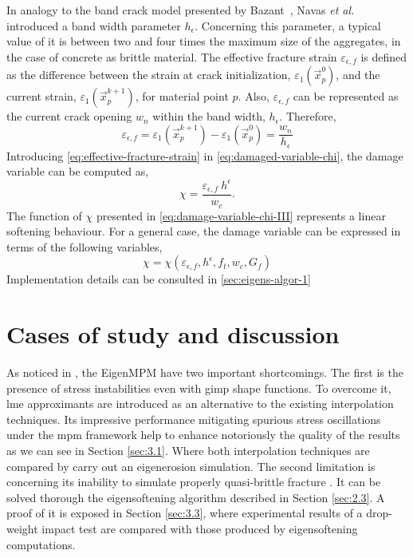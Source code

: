 \documentclass[preprint,12pt,a4paper]{elsarticle}
\begin{document}
In analogy to the band crack model presented by
Bazant~\cite{Bazant83}, Navas {\it et al.} \cite{Navas_2018_ES}
\cite{Navas_2017_ES} introduced a band width parameter $h_{\epsilon}$.
Concerning this parameter, a typical value of it is between two and
four times the maximum size of the aggregates, in the case of
concrete as brittle material. The effective fracture strain
$\varepsilon_{\epsilon,f}$ is defined as the difference between the strain at crack initialization,
$\varepsilon_1(\vec{x}_p^{0})$, and the current strain, $\varepsilon_1(\vec{x}_p^{k+1})$, for material point $p$. Also,
$\varepsilon_{\epsilon,f}$ can be represented as the current crack
opening $w_n$ within the band width, $h_{\epsilon}$. Therefore, 
\begin{equation}
  \label{eq:effective-fracture-strain}
  \varepsilon_{\epsilon,f} = \varepsilon_1(\vec{x}_p^{k+1}) -
  \varepsilon_1(\vec{x}_p^{0}) = \frac{w_n}{h_{\epsilon}}
\end{equation}
Introducing \eqref{eq:effective-fracture-strain} in
\eqref{eq:damaged-variable-chi}, the damage variable can be computed
as,
\begin{equation}
  \label{eq:damage-variable-chi-II}
\chi = \frac{\varepsilon_{\epsilon,f}\ h^{\epsilon}}{w_c}.  
\end{equation}
The function of $\chi$ presented in \eqref{eq:damage-variable-chi-III}
represents a linear softening behaviour. For a general case, the
damage variable can be expressed in terms of the following variables,
\begin{equation}
  \label{eq:damage-variable-chi-III}
  \chi = \chi(\varepsilon_{\epsilon,f}, h^{\epsilon}, f_t, w_c, G_f)
\end{equation}
Implementation details can be consulted in \ref{sec:eigens-algor-1}
\section{Cases of study and discussion}
\label{sec:3}

As noticed in \cite{Zhang_EE_2020}, the EigenMPM have two important
shortcomings. The first is the presence of stress instabilities even
with \acrshort{gimp} shape functions. To overcome it, \acrshort{lme}
approximants are introduced as an
alternative to the existing interpolation techniques. Its
impressive performance mitigating spurious stress oscillations
\cite{Wobbes2020} under the \acrshort{mpm} framework help to enhance
notoriously the quality of the results as we can see in Section
\ref{sec:3.1}. Where both interpolation techniques
are compared by carry out an eigenerosion simulation. The second
limitation is concerning its inability to simulate properly quasi-brittle
fracture \cite{Navas_2018_ES}. It can be solved thorough the
eigensoftening algorithm described in Section \ref{sec:2.3}. A proof
of it is exposed in Section \ref{sec:3.3}, where experimental results
of a drop-weight impact test are compared with those produced by
eigensoftening computations.
\end{document}
